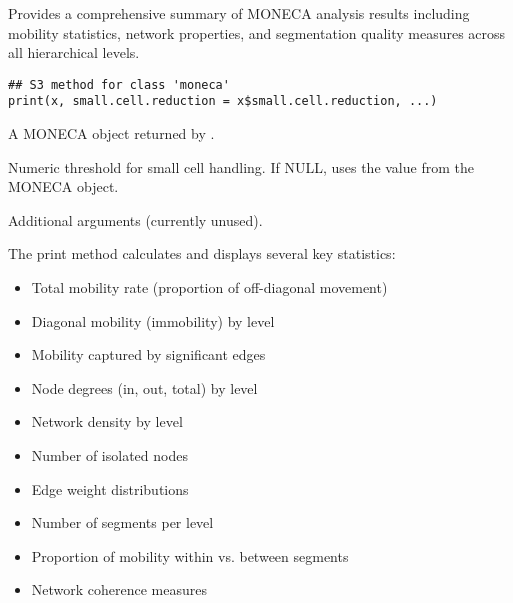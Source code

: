\documentclass[a4paper]{book}
\begin{document}
%
\begin{Description}
Provides a comprehensive summary of MONECA analysis results including mobility
statistics, network properties, and segmentation quality measures across all
hierarchical levels.
\end{Description}
%
\begin{Usage}
\begin{verbatim}
## S3 method for class 'moneca'
print(x, small.cell.reduction = x$small.cell.reduction, ...)
\end{verbatim}
\end{Usage}
%
\begin{Arguments}
\begin{ldescription}
\item[\code{x}] A MONECA object returned by .

\item[\code{small.cell.reduction}] Numeric threshold for small cell handling. If NULL,
uses the value from the MONECA object.

\item[\code{...}] Additional arguments (currently unused).
\end{ldescription}
\end{Arguments}
%
\begin{Details}
The print method calculates and displays several key statistics:

\begin{itemize}

\item{} Total mobility rate (proportion of off-diagonal movement)
\item{} Diagonal mobility (immobility) by level
\item{} Mobility captured by significant edges

\end{itemize}


\begin{itemize}

\item{} Node degrees (in, out, total) by level
\item{} Network density by level
\item{} Number of isolated nodes
\item{} Edge weight distributions

\end{itemize}


\begin{itemize}

\item{} Number of segments per level
\item{} Proportion of mobility within vs. between segments
\item{} Network coherence measures

\end{itemize}

\end{Details}
\end{document}
